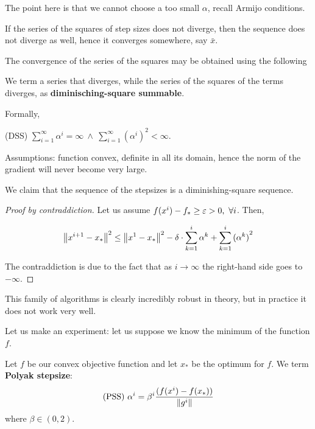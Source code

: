 \documentclass[computational_mathematics.tex]{subfiles}
\begin{document}
The point here is that we cannot choose a too small $\alpha$, recall Armijo conditions.

If the series of the squares of step sizes does not diverge, then the sequence does not diverge as well, hence it converges somewhere, say $\bar{x}$.

The convergence of the series of the squares may be obtained using the following 

\begin{definition}
  We term a series that diverges, while the series of the squares of the terms diverges, as \textbf{diminisching-square summable}.
  
  Formally,
  
  (DSS) $\sum\limits_{i=1}^\infty \alpha^i = \infty~\wedge~\sum\limits_{i=1}^\infty {(\alpha^i)}^2 < \infty$.
\end{definition}

Assumptions: function convex, definite in all its domain, hence the norm of the gradient will never become very large.

\begin{proposition}
We claim that the sequence of the stepsizes is a diminishing-square sequence.
\end{proposition}

\begin{proof}[Proof by contraddiction]
Let us assume $f(x^i) - f_* \ge \varepsilon > 0,~\forall i$. Then,

  \[
    {\left\lVert x^{i+1} - x_*\right\rVert}^2 \le {\left\lVert x^1 -x_*\right\rVert}^2 - \delta \cdot \sum\limits_{k=1}^{i} \alpha^k + \sum\limits_{k=1}^{i} {(\alpha^k)}^2
  \]

The contraddiction is due to the fact that as $i \to \infty$ the right-hand side goes to $- \infty$.
\end{proof}

This family of algorithms is clearly incredibly robust in theory, but in practice it does not work very well.

Let us make an experiment: let us suppose we know the minimum of the function $f$. 

\begin{definition}
Let $f$ be our convex objective function and let $x_*$ be the optimum for $f$.
  We term \textbf{Polyak stepsize}:
  \[
    \text{(PSS)}~\alpha^i = \beta^i \frac{(f(x^i) - f(x_*))}{\left\lVert g^i\right\rVert}
  \]
  where $\beta \in (0, 2)$.

 \end{definition}
 
\end{document}
